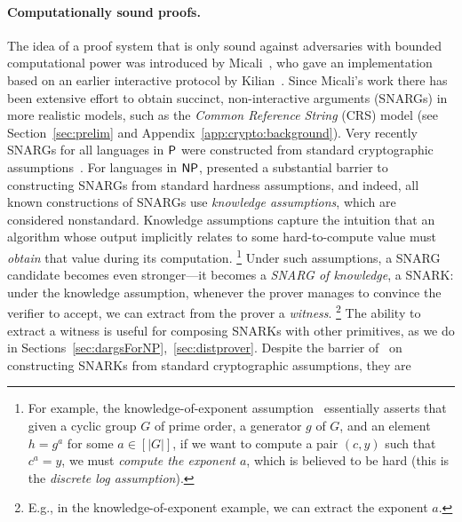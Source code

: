 \paragraph{Computationally sound proofs.}
The idea of a proof system that is only sound against adversaries with bounded computational power
was introduced by Micali~\cite{micali2000computationally},
who gave an implementation 
based on an earlier interactive protocol by Kilian~\cite{kilian1992note}.
Since Micali's work
there has been extensive effort to obtain succinct, non-interactive arguments (SNARGs) in more realistic models, such as the \emph{Common Reference String} (CRS) model (see Section~\ref{sec:prelim} and Appendix~\ref{app:crypto:background}).
Very recently SNARGs for all languages in ${\mathsf{P}}$ were constructed from standard cryptographic assumptions~\cite{kalai2019delegate, jawale2021snargs, choudhuri2021snargs, cryptoeprint:2022/1320}. For languages in ${\mathsf{NP}}$, \cite{gentry2011separating} presented a substantial barrier to constructing SNARGs from standard hardness assumptions, and indeed, all known constructions of SNARGs use \emph{knowledge assumptions}, which are considered nonstandard.
%
Knowledge assumptions capture the intuition that an algorithm whose output implicitly relates to some
hard-to-compute value must \emph{obtain} that value during its computation.%
\footnote{For example, 
the knowledge-of-exponent assumption~\cite{KOE}
essentially asserts that given a cyclic group $G$ of prime order,
a generator $g$ of $G$, and an element $h = g^a$ for some $a \in [|G|]$,
if we want to compute a pair $(c,y)$ such that $c^a = y$,
we must \emph{compute the exponent $a$}, which is believed to be hard (this is the \emph{discrete log assumption}).}
Under such assumptions, a SNARG candidate becomes even stronger---it becomes
a \emph{SNARG of knowledge}, a SNARK:
under the knowledge assumption, whenever the prover manages to convince the verifier to accept,
we can extract from the prover a \emph{witness}.%
\footnote{E.g., in the knowledge-of-exponent example, we can extract the exponent $a$.}
The ability to extract a witness is useful for composing SNARKs with other primitives,
as we do in Sections~\ref{sec:dargsForNP},~\ref{sec:distprover}.
Despite the barrier of~\cite{gentry2011separating} on constructing
SNARKs from standard cryptographic assumptions, they are 
